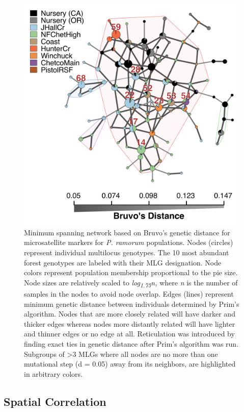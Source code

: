 \documentclass[double,12pt]{beavtex}
\begin{document}
  \begin{figure}
  
  {\centering \includegraphics[width=0.75\linewidth]{figure/phytopathology/figure_3} 
  
  }
  
  \caption[Minimum spanning network based on Bruvo's genetic distance for
  microsatellite markers for \emph{P. ramorum} populations.]{Minimum spanning network based on Bruvo's genetic distance for
  microsatellite markers for \emph{P. ramorum} populations. Nodes
  (circles) represent individual multilocus genotypes. The 10 most
  abundant forest genotypes are labeled with their MLG designation. Node
  colors represent population membership proportional to the pie size.
  Node sizes are relatively scaled to \emph{log\textsubscript{1.75}n,}
  where \emph{n} is the number of samples in the nodes to avoid node
  overlap. Edges (lines) represent minimum genetic distance between
  individuals determined by Prim's algorithm. Nodes that are more closely
  related will have darker and thicker edges whereas nodes more distantly
  related will have lighter and thinner edges or no edge at all.
  Reticulation was introduced by finding exact ties in genetic distance
  after Prim's algorithm was run. Subgroups of \textgreater{}3 MLGs where
  all nodes are no more than one mutational step (d = 0.05) away from its
  neighbors, are highlighted in arbitrary colors.}\label{fig:ramorum3}
  \end{figure}
  
  \newpage
  
  \subsection{Spatial Correlation}\label{spatial-correlation}
  
\end{document}
